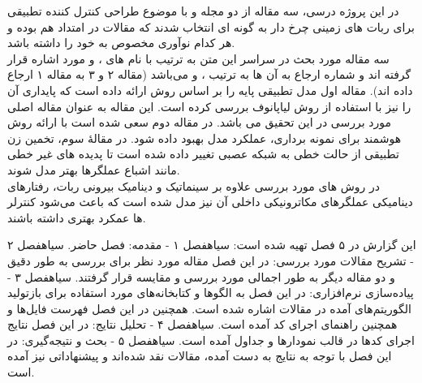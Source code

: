 در این پروژه درسی، سه مقاله از دو مجله  و 
با موضوع طراحی کنترل کننده تطبیقی برای ربات های زمینی چرخ دار به گونه ای انتخاب شدند که مقالات در امتداد هم بوده و هر کدام نوآوری مخصوص به خود را داشته باشد.\\
سه مقاله مورد بحث در سراسر این متن به ترتیب با نام های \آ، \ب و \پ مورد اشاره قرار گرفته اند و شماره ارجاع به آن ها به ترتیب ،  و  می‌باشد (مقاله ۲ و ۳ به مقاله ۱ ارجاع داده اند). 
مقاله اول مدل تطبیقی پایه را بر اساس روش  ارائه داده است که پایداری آن را نیز با استفاده از روش لیاپانوف  بررسی کرده است. این مقاله به عنوان مقاله اصلی مورد بررسی در این تحقیق می باشد. در مقاله دوم سعی شده است با ارائه روش هوشمند برای نمونه برداری، عملکرد مدل بهبود داده شود. در مقالۀ سوم، تخمین زن تطبیقی از حالت خطی به شبکه عصبی تغییر داده شده است تا پدیدە های غیر خطی مانند اشباع عملگرها بهتر مدل شوند.\\
در روش های مورد بررسی علاوه بر سینماتیک و دینامیک بیرونی ربات، رفتارهای دینامیکی عملگرهای مکاترونیکی داخلی آن نیز مدل شده است که باعث می‌شود کنترلر ها عمکرد بهتری داشته باشند.  

این گزارش در ۵ فصل تهیه شده است:
 ‌سیاه{فصل ۱ - مقدمه}: فصل حاضر.
 ‌سیاه{فصل ۲ - تشریح مقالات مورد بررسی}: در این فصل مقاله مورد نظر برای بررسی به طور دقیق و دو مقاله دیگر به طور اجمالی مورد بررسی و مقایسه قرار گرفتند.
 ‌سیاه{فصل ۳ - پیاده‌سازی نرم‌افزاری}: در این فصل به الگوها و کتابخانه‌های مورد استفاده برای بازتولید الگوریتم‌های آمده در مقالات اشاره شده است. همچنین در این فصل فهرست فایل‌ها و همچنین راهنمای اجرای کد آمده است.
 ‌سیاه{فصل ۴ - تحلیل نتایج}: در این فصل نتایج اجرای کد‌ها در قالب نمودارها و جداول آمده است.
 ‌سیاه{فصل ۵ - بحث و نتیجه‌گیری}: در این فصل با توجه به نتایج به دست آمده، مقالات نقد شده‌اند و پیشنهاداتی نیز آمده است.

